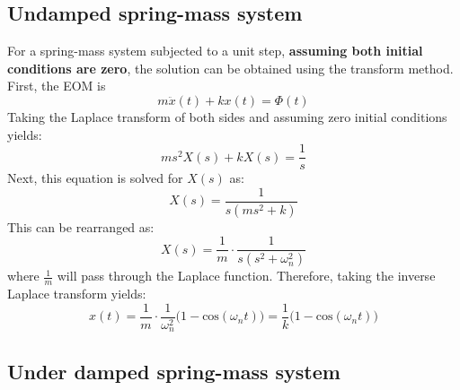 \documentclass[12pt,a4paper]{article}
\begin{document}
\subsection*{Undamped spring-mass system}

For a spring-mass system subjected to a unit step, \textbf{assuming both initial conditions are zero}, the solution can be obtained using the transform method. First, the EOM is 
\begin{equation}
m\ddot{x}(t) + kx(t) = \Phi(t)
\end{equation}
Taking the Laplace transform of both sides and assuming zero initial conditions yields:
\begin{equation}
	ms^2X(s)+kX(s) =\frac{1}{s}
\end{equation}
Next, this equation is solved for $X(s)$ as:
\begin{equation}
	X(s) = \frac{1}{s(ms^2+k)}
\end{equation}
This can be rearranged as:
\begin{equation}
	X(s) = \frac{1}{m} \cdot \frac{1}{s(s^2+\omega_n^2)}
\end{equation}
where $\frac{1}{m}$ will pass through the Laplace function. Therefore, taking the inverse Laplace transform yields:
\begin{equation}
	x(t) = \frac{1}{m} \cdot \frac{1}{\omega_n^2}\big(1-\text{cos}(\omega_n t)\big) = \frac{1}{k}\big(1-\text{cos}(\omega_n t)\big)
\end{equation}
 
\subsection*{Under damped spring-mass system}
\end{document}
